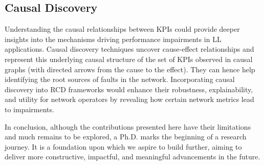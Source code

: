\subsection*{Causal Discovery}
Understanding the causal relationships between KPIs could provide deeper insights into the mechanisms driving performance impairments in LL applications. Causal discovery techniques \cite{hasan2023survey, gong2024causal} uncover cause-effect relationships and represent this underlying causal structure of the set of KPIs observed in causal graphs (with directed arrows from the cause to the effect). They can hence help identifying the root sources of faults in the network. Incorporating causal discovery into RCD frameworks would enhance their robustness, explainability, and utility for network operators by revealing how certain network metrics lead to impairments.

In conclusion, although the contributions presented here have their limitations and much remains to be explored, a Ph.D. marks the beginning of a research journey. It is a foundation upon which we aspire to build further, aiming to deliver more constructive, impactful, and meaningful advancements in the future.

